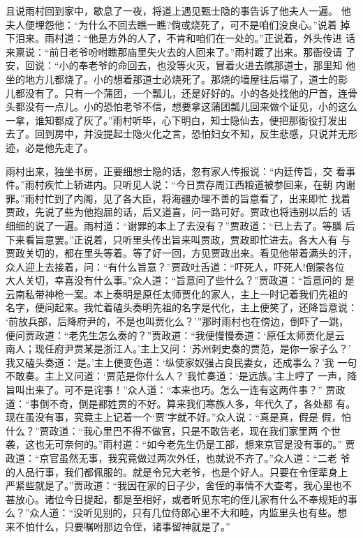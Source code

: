 且说雨村回到家中，歇息了一夜，将道上遇见甄士隐的事告诉了他夫人一遍。
他夫人便埋怨他：“为什么不回去瞧一瞧?倘或烧死了，可不是咱们没良心。”说着
掉下泪来。雨村道：“他是方外的人了，不肯和咱们在一处的。”正说着，外头传进
话来禀说：“前日老爷吩咐瞧那庙里失火去的人回来了。”雨村踱了出来。那衙役请
了安，回说：“小的奉老爷的命回去，也没等火灭，冒着火进去瞧那道士，那里知
他坐的地方儿都烧了。小的想着那道士必烧死了。那烧的墙屋往后塌了，道士的影
儿都没有了。只有一个蒲团，一个瓢儿，还是好好的。小的各处找他的尸首，连骨
头都没有一点儿。小的恐怕老爷不信，想要拿这蒲团瓢儿回来做个证见，小的这么
一拿，谁知都成了灰了。”雨村听毕，心下明白，知士隐仙去，便把那衙役打发出
去了。回到房中，并没提起士隐火化之言，恐怕妇女不知，反生悲感，只说并无形
迹，必是他先走了。

雨村出来，独坐书房，正要细想士隐的话，忽有家人传报说：“内廷传旨，交
看事件。”雨村疾忙上轿进内。只听见人说：“今日贾存周江西粮道被参回来，在朝
内谢罪。”雨村忙到了内阁，见了各大臣，将海疆办理不善的旨意看了，出来即忙
找着贾政，先说了些为他抱屈的话，后又道喜，问一路可好。贾政也将违别以后的
话细细的说了一遍。雨村道：“谢罪的本上了去没有？”贾政道：“已上去了。等膳
后下来看旨意罢。”正说着，只听里头传出旨来叫贾政，贾政即忙进去。各大人有
与贾政关切的，都在里头等着。等了好一回，方见贾政出来。看见他带着满头的汗，
众人迎上去接着，问：“有什么旨意？”贾政吐舌道：“吓死人，吓死人!倒蒙各位
大人关切，幸喜没有什么事。”众人道：“旨意问了些什么？”贾政道：“旨意问的
是云南私带神枪一案。本上奏明是原任太师贾化的家人，主上一时记着我们先祖的
名字，便问起来。我忙着磕头奏明先祖的名字是代化，主上便笑了，还降旨意说：
‘前放兵部，后降府尹的，不是也叫贾化么？’”那时雨村也在傍边，倒吓了一跳，
便问贾政道：“老先生怎么奏的？”贾政道：“我便慢慢奏道：‘原任太师贾化是云
南人；现任府尹贾某是浙江人。’主上又问：‘苏州刺史奏的贾范，是你一家子么？’
我又磕头奏道：‘是。’主上便变色道：‘纵使家奴强占良民妻女，还成事么？’我
一句不敢奏。主上又问道：‘贾范是你什么人？’我忙奏道：‘是远族。’主上哼了
一声，降旨叫出来了。可不是诧事！”众人道：“本来也巧。怎么一连有这两件事？”
贾政道：“事倒不奇，倒是都姓贾的不好。算来我们寒族人多，年代久了，各处都
有。现在虽没有事，究竟主上记着一个‘贾’字就不好。”众人说：“真是真，假是
假，怕什么？”贾政道：“我心里巴不得不做官，只是不敢告老，现在我们家里两
个世袭，这也无可奈何的。”雨村道：“如今老先生仍是工部，想来京官是没有事的。”
贾政道：“京官虽然无事，我究竟做过两次外任，也就说不齐了。”众人道：“二老
爷的人品行事，我们都佩服的。就是令兄大老爷，也是个好人。只要在令侄辈身上
严紧些就是了。”贾政道：“我因在家的日子少，舍侄的事情不大查考，我心里也不
甚放心。诸位今日提起，都是至相好，或者听见东宅的侄儿家有什么不奉规矩的事
么？”众人道：“没听见别的，只有几位侍郎心里不大和睦，内监里头也有些。想
来不怕什么，只要嘱咐那边令侄，诸事留神就是了。”

